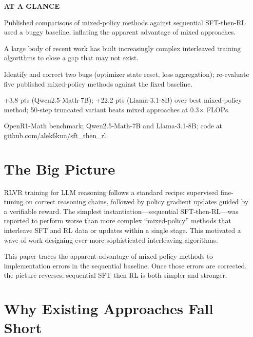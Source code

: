 \documentclass[10pt,twocolumn]{article}
\begin{document}
\begin{mdframed}[backgroundcolor=boxgray,linecolor=rulered,linewidth=1pt,
    innerleftmargin=6pt,innerrightmargin=6pt,
    innertopmargin=6pt,innerbottommargin=6pt]
\textbf{\small AT A GLANCE}\par\vspace{4pt}
\begin{description}[leftmargin=0pt,labelsep=4pt,itemsep=2pt,parsep=0pt,
    font=\small\bfseries]
  \item[Problem:] Published comparisons of mixed-policy methods against sequential SFT-then-RL used a buggy baseline, inflating the apparent advantage of mixed approaches.
  \item[Why it matters:] A large body of recent work has built increasingly complex interleaved training algorithms to close a gap that may not exist.
  \item[Method:] Identify and correct two bugs (optimizer state reset, loss aggregation); re-evaluate five published mixed-policy methods against the fixed baseline.
  \item[Result:] +3.8 pts (Qwen2.5-Math-7B); +22.2 pts (Llama-3.1-8B) over best mixed-policy method; 50-step truncated variant beats mixed approaches at 0.3$\times$ FLOPs.
  \item[Evidence:] OpenR1-Math benchmark; Qwen2.5-Math-7B and Llama-3.1-8B; code at github.com/alek6kun/sft\_then\_rl.
\end{description}
\end{mdframed}

\section{The Big Picture}

RLVR training for LLM reasoning follows a standard recipe: supervised fine-tuning on correct reasoning chains, followed by policy gradient updates guided by a verifiable reward.
The simplest instantiation---sequential SFT-then-RL---was reported to perform worse than more complex ``mixed-policy'' methods that interleave SFT and RL data or updates within a single stage.
This motivated a wave of work designing ever-more-sophisticated interleaving algorithms.

This paper traces the apparent advantage of mixed-policy methods to implementation errors in the sequential baseline.
Once those errors are corrected, the picture reverses: sequential SFT-then-RL is both simpler and stronger.

\section{Why Existing Approaches Fall Short}
\end{document}
